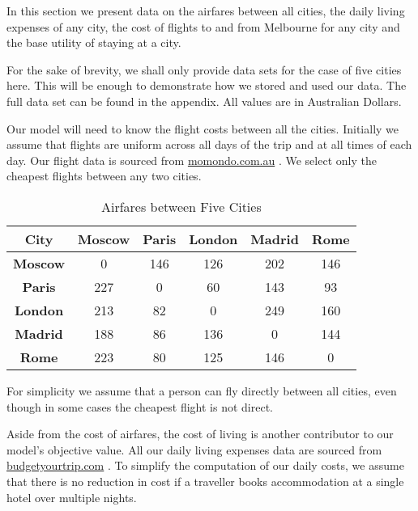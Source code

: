 \documentclass[12pt]{article}
\begin{document}

In this section we present data on the airfares between all cities, the daily living expenses of any city, the cost of flights to and from Melbourne for any city and the base utility of staying at a city.

For the sake of brevity, we shall only provide data sets for the case of five cities here. This will be enough to demonstrate how we stored and used our data. The full data set can be found in the appendix. All values are in Australian Dollars.

Our model will need to know the flight costs between all the cities. Initially we assume that flights are uniform across all days of the trip and at all times of each day. Our flight data is sourced from \url{momondo.com.au} \cite{momondo}. We select only the cheapest flights between any two cities.

\begin{table}[h!]
\centering
\vspace{1mm}
\begin{tabular}{c|c|c|c|c|c}
\hline
\rule{0pt}{2ex} \textbf{City}  & \textbf{Moscow} & \textbf{Paris} & \textbf{London} & \textbf{Madrid} & \textbf{Rome} \\
\hline
\rule{0pt}{2ex}\textbf{Moscow} & 0 & 146 & 126 & 202 & 146 \\
\textbf{Paris} & 227 & 0 & 60 & 143 & 93 \\
\textbf{London} & 213 & 82 & 0 & 249 & 160 \\
\textbf{Madrid} & 188 & 86 & 136 & 0 & 144 \\
\textbf{Rome} & 223 & 80 & 125 & 146 & 0 \\\hline
\end{tabular}
\caption{Airfares between Five Cities}
\end{table}

For simplicity we assume that a person can fly directly between all cities, even though in some cases the cheapest flight is not direct. 

Aside from the cost of airfares, the cost of living is another contributor to our model's objective value. All our daily living expenses data are sourced from \url{budgetyourtrip.com} \cite{budget}. To simplify the computation of our daily costs, we assume that there is no reduction in cost if a traveller books accommodation at a single hotel over multiple nights.
\end{document}
